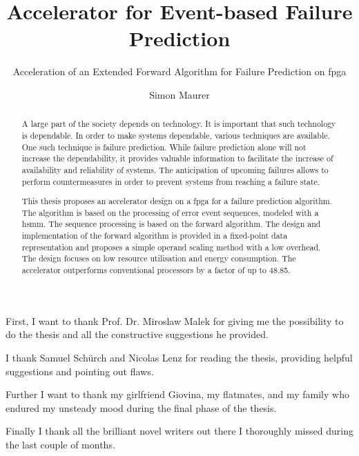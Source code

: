 \documentclass[mscthesis]{usiinfthesis}
\title{Accelerator for Event-based Failure Prediction} %
\subtitle{Acceleration of an Extended Forward Algorithm for Failure Prediction
    on \acrshort{fpga}}
\author{Simon Maurer} %
\begin{document}
\maketitle %

\frontmatter %

\begin{abstract}
    A large part of the society depends on technology. It is important
    that such technology is dependable. In order to make systems dependable,
    various techniques are available. One such technique is failure prediction.
    While failure prediction alone will not increase the dependability, it
    provides valuable information to facilitate the increase of availability
    and reliability of systems. The anticipation of upcoming failures allows to
    perform countermeasures in order to prevent systems from reaching a failure
    state.

    This thesis proposes an accelerator design on a \acrfull{fpga} for
    a failure prediction algorithm. The algorithm is based on the processing of
    error event sequences, modeled with a \acrfull{hsmm}. The sequence
    processing is based on the forward algorithm. The design and implementation
    of the forward algorithm is provided in a fixed-point data representation
    and proposes a simple operand scaling method with a low overhead. The
    design focuses on low resource utilisation and energy consumption. The
    accelerator outperforms conventional processors by a factor of up to 48.85.
\end{abstract}

%

\begin{acknowledgements}
First, I want to thank Prof. Dr. Miroslaw Malek for giving me the possibility
to do the thesis and all the constructive suggestions he provided.

I thank Samuel Sch\"{u}rch and Nicolas Lenz for reading the thesis, providing
helpful suggestions and pointing out flaws.

Further I want to thank my girlfriend Giovina, my flatmates, and my family who
endured my unsteady mood during the final phase of the thesis.

Finally I thank all the brilliant novel writers out there I thoroughly missed
during the last couple of months.

\end{acknowledgements}
\end{document}

